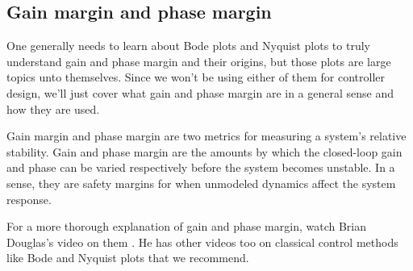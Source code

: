 \subsection{Gain margin and phase margin}
\label{subsec:gain_phase_margin}

One generally needs to learn about Bode plots and Nyquist plots to truly
understand gain and phase margin and their origins, but those plots are large
topics unto themselves. Since we won't be using either of them for controller
design, we'll just cover what gain and phase margin are in a general sense and
how they are used.

Gain margin and phase margin are two metrics for measuring a \gls{system}'s
relative stability. Gain and phase margin are the amounts by which the
closed-loop gain and phase can be varied respectively before the \gls{system}
becomes unstable. In a sense, they are safety margins for when unmodeled
dynamics affect the \gls{system response}.

For a more thorough explanation of gain and phase margin, watch Brian Douglas's
video on them \cite{bib:gain_phase_margin}. He has other videos too on classical
control methods like Bode and Nyquist plots that we recommend.
